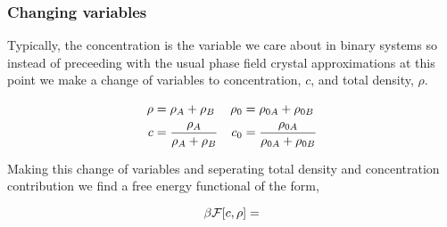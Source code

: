 \subsubsection{Changing variables}
Typically, the concentration is the variable we care about in binary systems so instead of preceeding with the usual phase field crystal approximations at this point we make a change of variables to concentration, $c$, and total density, $\rho$.

\begin{align}
    \rho &= \rho_A + \rho_B             & \rho_0 &= \rho_{0A} + \rho_{0B} \nonumber \\
    c &= \frac{\rho_A}{\rho_A + \rho_B}    &  c_0 &= \frac{\rho_{0A}}{\rho_{0A} + \rho_{0B}} \nonumber
\end{align}

Making this change of variables and seperating total density and concentration contribution we find a free energy functional of the form,

\begin{equation}
    \beta\mathcal{F}[c, \rho] = 
\end{equation}
